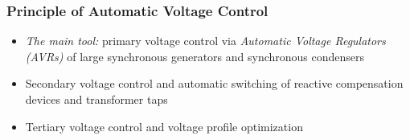 \begin{frame}
    \frametitle{Principle of Automatic Voltage Control}
    \begin{itemize}
        \item \textit{The main tool:} primary voltage control via \textit{Automatic Voltage Regulators (AVRs)} of large synchronous generators and synchronous condensers
        \item Secondary voltage control and automatic switching of reactive compensation devices and transformer taps
        \item Tertiary voltage control and voltage profile optimization
    \end{itemize}
\end{frame}

